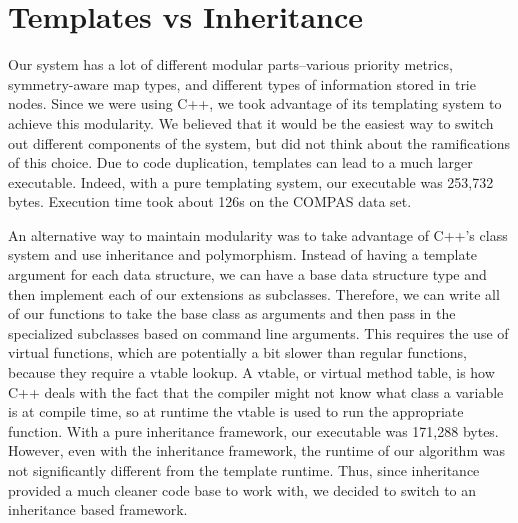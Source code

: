 \section{Templates vs Inheritance}
Our system has a lot of different modular parts--various priority metrics, symmetry-aware map types, and different types of information stored in trie nodes.
Since we were using C++, we took advantage of its templating system to achieve this modularity.
We believed that it would be the easiest way to switch out different components of the system, but did not think about the ramifications of this choice.
Due to code duplication, templates can lead to a much larger executable.
Indeed, with a pure templating system, our executable was 253,732 bytes.
Execution time took about 126s on the COMPAS data set.

An alternative way to maintain modularity was to take advantage of C++'s class system and use inheritance and polymorphism.
Instead of having a template argument for each data structure, we can have a base data structure type and then implement each of our extensions as subclasses.
Therefore, we can write all of our functions to take the base class as arguments and then pass in the specialized subclasses based on command line arguments.
This requires the use of virtual functions, which are potentially a bit slower than regular functions, because they require a vtable lookup.
A vtable, or virtual method table, is how C++ deals with the fact that the compiler might not know what class a variable is at compile time, so at runtime the vtable is used to run the appropriate function.
With a pure inheritance framework, our executable was 171,288 bytes.
However, even with the inheritance framework, the runtime of our algorithm was not significantly different from the template runtime.
Thus, since inheritance provided a much cleaner code base to work with, we decided to switch to an inheritance based framework.

